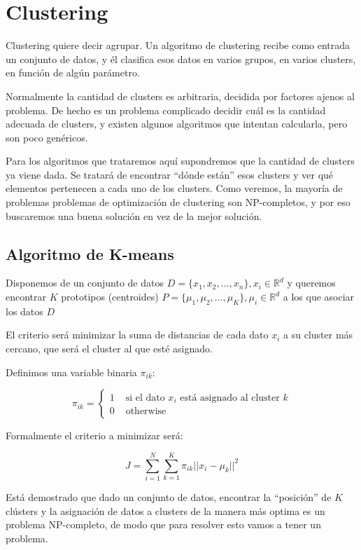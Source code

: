 
\section{Clustering}
Clustering quiere decir agrupar. Un algoritmo de clustering recibe como entrada un conjunto de datos, y él clasifica esos datos en varios grupos, en varios clusters, en función de algún parámetro.

Normalmente la cantidad de clusters es arbitraria, decidida por factores ajenos al problema. De hecho es un problema complicado decidir cuál es la cantidad adecuada de clusters, y existen algunos algoritmos que intentan calcularla, pero son poco genéricos.

Para los algoritmos que trataremos aquí supondremos que la cantidad de clusters ya viene dada. Se tratará de encontrar ``dónde están'' esos clusters y ver qué elementos pertenecen a cada uno de los clusters. Como veremos, la mayoría de problemas problemas de optimización de clustering son NP-completos, y por eso buscaremos una buena solución en vez de la mejor solución.

\subsection{Algoritmo de K-means}
Disponemos de un conjunto de datos $D = \{x_1, x_2, \dots, x_n\}, x_i \in \mathbb{R}^d$ y queremos encontrar $K$ prototipos (centroides) $P = \{\mu_1, \mu_2, \dots, \mu_K\}, \mu_i \in \mathbb{R}^d$ a los que asociar los datos $D$

El criterio será minimizar la suma de distancias de cada dato $x_i$ a su cluster más cercano, que será el cluster al que esté asignado.

Definimos una variable binaria $\pi_{ik}$:

\begin{equation*}
\pi_{ik} =
\begin{cases}
1 & \text{ si el dato $x_i$ está asignado al cluster $k$} \\
0  & \text{ otherwise}
\end{cases}
\end{equation*}

Formalmente el criterio a minimizar será:

\begin{equation*}
J = \sum_{i = 1}^{N} \sum_{k = 1}^{K} \pi_{ik} ||x_i - \mu_k||^2
\end{equation*}

Está demostrado que dado un conjunto de datos, encontrar la ``posición'' de $K$ clústers y la asignación de datos a clusters de la manera más optima es un problema NP-completo, de modo que para resolver esto vamos a tener un problema.

